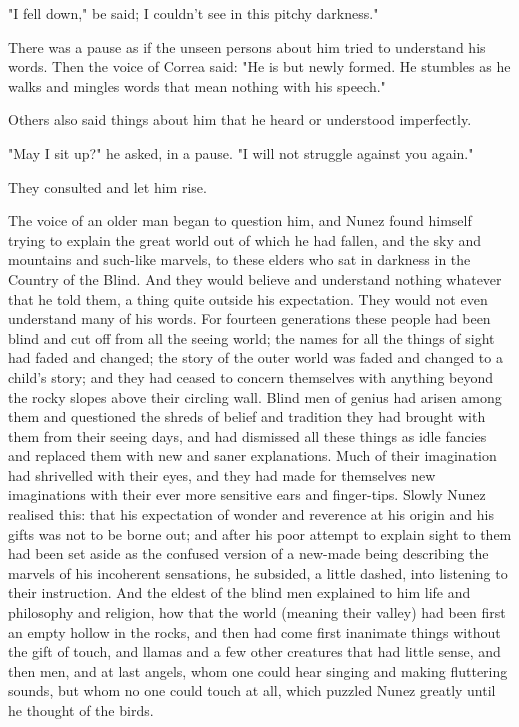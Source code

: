 \documentclass[courier]{sffms}
\begin{document}
"I fell down," be said; I couldn't see in this pitchy darkness."

There was a pause as if the unseen persons about him tried to
understand his words. Then the voice of Correa said: "He is but newly
formed. He stumbles as he walks and mingles words that mean nothing
with his speech."

Others also said things about him that he heard or understood
imperfectly.

"May I sit up?" he asked, in a pause. "I will not struggle against you
again."

They consulted and let him rise.

The voice of an older man began to question him, and Nunez found
himself trying to explain the great world out of which he had fallen,
and the sky and mountains and such-like marvels, to these elders who
sat in darkness in the Country of the Blind. And they would believe
and understand nothing whatever that he told them, a thing quite
outside his expectation. They would not even understand many of his
words. For fourteen generations these people had been blind and cut
off from all the seeing world; the names for all the things of sight
had faded and changed; the story of the outer world was faded and
changed to a child's story; and they had ceased to concern themselves
with anything beyond the rocky slopes above their circling wall. Blind
men of genius had arisen among them and questioned the shreds of
belief and tradition they had brought with them from their seeing
days, and had dismissed all these things as idle fancies and replaced
them with new and saner explanations. Much of their imagination had
shrivelled with their eyes, and they had made for themselves new
imaginations with their ever more sensitive ears and
finger-tips. Slowly Nunez realised this: that his expectation of
wonder and reverence at his origin and his gifts was not to be borne
out; and after his poor attempt to explain sight to them had been set
aside as the confused version of a new-made being describing the
marvels of his incoherent sensations, he subsided, a little dashed,
into listening to their instruction. And the eldest of the blind men
explained to him life and philosophy and religion, how that the world
(meaning their valley) had been first an empty hollow in the rocks,
and then had come first inanimate things without the gift of touch,
and llamas and a few other creatures that had little sense, and then
men, and at last angels, whom one could hear singing and making
fluttering sounds, but whom no one could touch at all, which puzzled
Nunez greatly until he thought of the birds.
\end{document}
